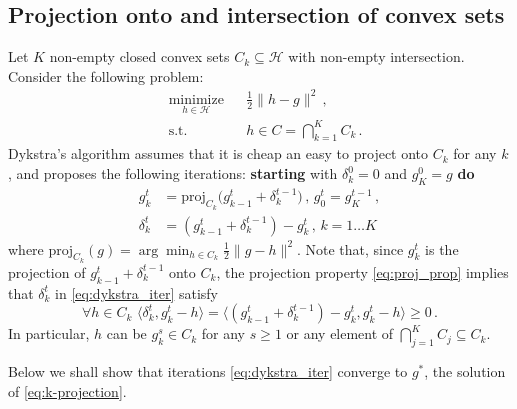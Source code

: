 \documentclass[a4paper]{article}
\newcommand{\Hcal}{\mathcal{H}}
\begin{document}

\subsection*{Projection onto and intersection of convex sets} %
\label{sub:projection_onto_and_intersection_of_convex_sets}

Let $K$ non-empty closed convex sets $C_k \subseteq \Hcal$ with non-empty intersection.
Consider the following problem:
\begin{equation} \label{eq:k-projection}  %
  \begin{aligned}
    & \underset{h \in \Hcal}{\text{minimize}}
      & & \tfrac12 \|h - g\|^2
          \,, \\
    & \text{s.t.}
      & & h \in C = \bigcap_{k=1}^K C_k
          \,.
  \end{aligned}
\end{equation}
Dykstra's algorithm assumes that it is cheap an easy to project onto $C_k$ for any $k$,
and proposes the following iterations: {\bf starting} with $\delta^0_k = 0$ and $g^0_K = g$
{\bf do}
\begin{equation} \label{eq:dykstra_iter}  %
  \begin{aligned}
    g^t_k
      &= \mathrm{proj}_{C_k}\bigl( g^t_{k-1} + \delta^{t-1}_k \bigr)
      \,,
      \, g^t_0 = g^{t-1}_K
      \,, \\
    \delta^t_k
      &= (g^t_{k-1} + \delta^{t-1}_k) - g^t_k
      \,,
      \, k = 1\ldots K
  \end{aligned}
\end{equation}
where $\mathrm{proj}_{C_k}(g) = \arg\min_{h \in C_k} \tfrac12 \|g - h\|^2$. Note
that, since $g^t_k$ is the projection of $g^t_{k-1} + \delta^{t-1}_k$ onto $C_k$,
the projection property \eqref{eq:proj_prop} implies that $\delta^t_k$ in
\eqref{eq:dykstra_iter} satisfy
\begin{equation} \label{eq:dykstra_prop}
  \forall{h\in C_k}
  \,\,
  \langle \delta^t_k, g^t_k - h \rangle
  = \bigl\langle (g^t_{k-1} + \delta^{t-1}_k) - g^t_k, g^t_k - h \bigr \rangle
  \geq 0
  \,.
\end{equation}
In particular, $h$ can be $g^s_k \in C_k$ for any $s\geq 1$ or any element of
$\bigcap_{j=1}^K C_j \subseteq C_k$.

Below we shall show that iterations \eqref{eq:dykstra_iter} converge to $g^*$, the
solution of \eqref{eq:k-projection}.
\end{document}
